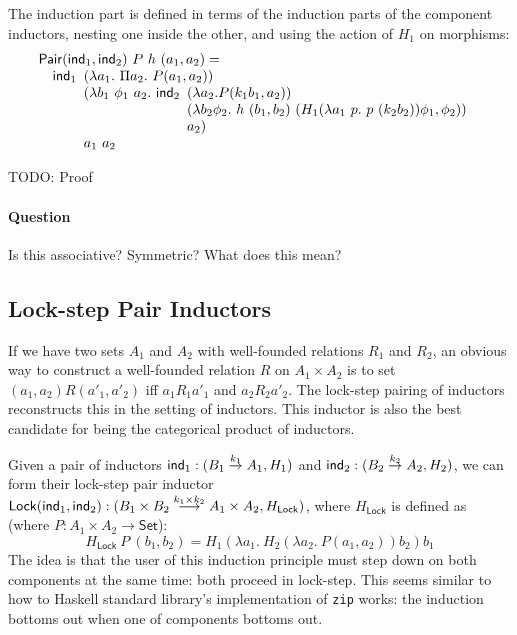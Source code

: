 \documentclass{article}
\newcommand{\Set}{\mathsf{Set}}
\begin{document}
The induction part is defined in terms of the induction parts of the
component inductors, nesting one inside the other, and using the
action of $H_1$ on morphisms:
\begin{displaymath}
  \begin{array}[t]{l}
    \mathsf{Pair}(\ind_1, \ind_2)\ P\ h\ (a_1,a_2) = \\
    \quad \ind_1
    \begin{array}[t]{l}
      (\lambda a_1.\ \Pi a_2.\ P(a_1,a_2)) \\
      (\lambda b_1\ \phi_1\ a_2.\ \ind_2
      \begin{array}[t]{l}
        (\lambda a_2. P(k_1b_1,a_2)) \\
        (\lambda b_2 \phi_2.\ h\ (b_1,b_2)\ (H_1(\lambda a_1\ p.\ p\ (k_2b_2))\phi_1,\phi_2)) \\
        a_2)
      \end{array} \\
      a_1\ a_2
    \end{array}
  \end{array}
\end{displaymath}

TODO: Proof

\paragraph{Question} Is this associative? Symmetric? What does this
mean?

\subsection{Lock-step Pair Inductors}

If we have two sets $A_1$ and $A_2$ with well-founded relations $R_1$
and $R_2$, an obvious way to construct a well-founded relation $R$ on
$A_1 \times A_2$ is to set $(a_1,a_2)R(a'_1,a'_2)$ iff $a_1R_1a'_1$
and $a_2R_2a'_2$. The lock-step pairing of inductors reconstructs this
in the setting of inductors. This inductor is also the best candidate
for being the categorical product of inductors.

Given a pair of inductors $\mathsf{ind}_1 : (B_1 \stackrel{k_1}\to A_1, H_1)$
and $\mathsf{ind}_2 : (B_2 \stackrel{k_2}\to A_2, H_2)$, we can form their
lock-step pair inductor $\mathsf{Lock}(\mathsf{ind}_1, \mathsf{ind}_2) : (B_1 \times
B_2 \stackrel{k_1 \times k_2}\longrightarrow A_1 \times A_2,
H_{\mathsf{Lock}})$, where $H_{\mathsf{Lock}}$ is defined as (where $P
: A_1 \times A_2 \to \Set$):
\begin{displaymath}
  H_{\mathsf{Lock}}\ P\ (b_1,b_2) = H_1(\lambda a_1.\ H_2(\lambda a_2.\ P(a_1,a_2))b_2)b_1
\end{displaymath}
The idea is that the user of this induction principle must step down
on both components at the same time: both proceed in lock-step. This
seems similar to how to Haskell standard library's implementation of
\texttt{zip} works: the induction bottoms out when one of components
bottoms out.
\end{document}
